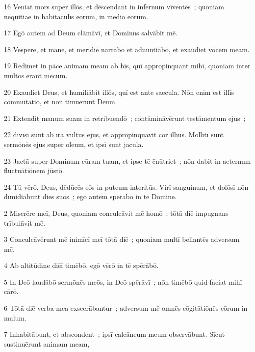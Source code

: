 \psalmVerse
  {\phantom{0}16}
  {Veniat mors super illōs, et dēscendant in infernum vīventēs~; quoniam nēquitiae in habitāculīs eōrum, in mediō eōrum.}


\psalmVerse
  {\phantom{0}17}
  {Egō autem ad Deum clāmāvī, et Dominus salvābit mē.}


\psalmVerse
  {\phantom{0}18}
  {Vespere, et māne, et merīdiē narrābō et adnuntiābō, et exaudiet vōcem meam.}


\psalmVerse
  {\phantom{0}19}
  {Redimet in pāce animam meam ab hīs, quī appropinquant mihī, quoniam inter multōs erant mēcum.}


\psalmVerse
  {\phantom{0}20}
  {Exaudiet Deus, et humiliābit illōs, quī est ante saecula. Nōn enim est illīs commūtātiō, et nōn timuērunt Deum.}


\psalmVerse
  {\phantom{0}21}
  {Extendit manum suam in retribuendō~; contāmināvērunt testāmentum ejus~;}


\psalmVerse
  {\phantom{0}22}
  {dīvīsī sunt ab īrā vultūs ejus, et appropinquāvit cor illīus. Mollītī sunt sermōnēs ejus super oleum, et ipsī sunt jacula.}


\psalmVerse
  {\phantom{0}23}
  {Jactā super Dominum cūram tuam, et ipse tē ēnūtriet~; nōn dabit in aeternum fluctuātiōnem jūstō.}


\psalmVerse
  {\phantom{0}24}
  {Tū vērō, Deus, dēdūcēs eōs in puteum interitūs. Virī sanguinum, et dolōsī nōn dīmidiābunt diēs suōs~; egō autem spērābō in tē Domine.}




\psalmVerse
  {\phantom{00}2}
  {Miserēre meī, Deus, quoniam conculcāvit mē homō~; tōtā diē impugnans trībulāvit mē.}


\psalmVerse
  {\phantom{00}3}
  {Conculcāvērunt mē inimīcī meī tōtā diē~; quoniam multī bellantēs adversum mē.}


\psalmVerse
  {\phantom{00}4}
  {Ab altitūdine diēī timēbō, egō vērō in tē spērābō.}


\psalmVerse
  {\phantom{00}5}
  {In Deō laudābō sermōnēs meōs, in Deō spērāvī~; nōn timēbō quid faciat mihī cārō.}


\psalmVerse
  {\phantom{00}6}
  {Tōtā diē verba mea exsecrābantur~; adversum mē omnēs cōgitātiōnēs eōrum in malum.}


\psalmVerse
  {\phantom{00}7}
  {Inhabitābunt, et abscondent~; ipsī calcāneum meum observābunt. Sīcut sustinuērunt animam meam,}



